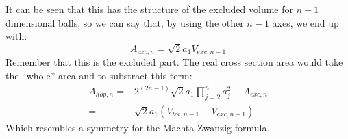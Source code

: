\documentclass[superscriptaddress,pre,reprint,showpacs,onecolumn]{revtex4-1}
\begin{document}
It can be seen that this has the structure of the excluded volume
for $n-1$ dimensional balls, so we can say that, by using the other
$n-1$ axes, we end up with:
\begin{equation}
  A_{exc,n}=\sqrt{2}a_1V_{exc,n-1}
\end{equation}
Remember that this is the excluded part. The real cross
section area would take
the ``whole'' area and to substract this term:
\begin{equation}
  \begin{split}
    A_{hop,n}  = & 2^(2n-1)\sqrt{2}a_1\prod_{j=2}^n a_j^2-A_{exc,n} \\
      = & \sqrt{2}a_1 (V_{tot,n-1} - V_{exc,n-1})
  \end{split} 
\end{equation}
Which resembles a symmetry for the Machta Zwanzig formula.
\end{document}
